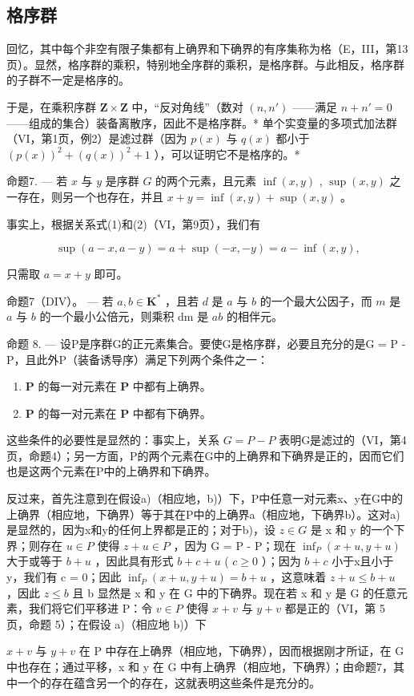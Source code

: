 \subsection{格序群}

回忆，其中每个非空有限子集都有上确界和下确界的有序集称为格（E，III，第13页）。显然，格序群的乘积，特别地全序群的乘积，是格序群。与此相反，格序群的子群不一定是格序的。

于是，在乘积序群 \(\mathbf{Z} \times \mathbf{Z}\) 中，“反对角线”（数对 \((n, n')\) ——满足 \(n + n' = 0\) ——组成的集合）装备离散序，因此不是格序群。* 单个实变量的多项式加法群（VI，第1页，例2）是滤过群（因为 \(p(x)\) 与 \(q(x)\) 都小于 \((p(x))^2 + (q(x))^2 + 1\) ），可以证明它不是格序的。*

命题7. --- 若 \(x\) 与 \(y\) 是序群 \(G\) 的两个元素，且元素 \(\inf(x, y)\) , \(\sup(x, y)\) 之一存在，则另一个也存在，并且 \(x + y = \inf(x, y) + \sup(x, y)\) 。

事实上，根据关系式(1)和(2)（VI，第9页），我们有

\[
\sup (a - x, a - y) = a + \sup (- x, - y) = a - \inf (x, y),
\]

只需取 \(a = x + y\) 即可。

命题7（DIV）。 --- 若 \(a, b \in \mathbf{K}^{*}\) ，且若 \(d\) 是 \(a\) 与 \(b\) 的一个最大公因子，而 \(m\) 是 \(a\) 与 \(b\) 的一个最小公倍元，则乘积 dm 是 \(ab\) 的相伴元。

命题 8. --- 设P是序群G的正元素集合。要使G是格序群，必要且充分的是G = P - P，且此外P（装备诱导序）满足下列两个条件之一：

\begin{enumerate}
\def\labelenumi{\alph{enumi})}
\item
  \(\mathbf{P}\) 的每一对元素在 \(\mathbf{P}\) 中都有上确界。
\item
  \(\mathbf{P}\) 的每一对元素在 \(\mathbf{P}\) 中都有下确界。
\end{enumerate}

这些条件的必要性是显然的：事实上，关系 \(G = P - P\) 表明G是滤过的（VI，第4页，命题4）；另一方面，P的两个元素在G中的上确界和下确界是正的，因而它们也是这两个元素在P中的上确界和下确界。

反过来，首先注意到在假设a)（相应地，b)）下，P中任意一对元素x、y在G中的上确界（相应地，下确界）等于其在P中的上确界a（相应地，下确界b）。这对a)是显然的，因为x和y的任何上界都是正的；对于b)，设 \(z \in G\) 是 x 和 y 的一个下界；则存在 \(u \in P\) 使得 \(z + u \in P\) ，因为 G = P - P；现在 \(\inf_{P}(x + u, y + u)\) 大于或等于 \(b + u\) ，因此具有形式 \(b + c + u\) ( \(c \geqslant 0\) ）；因为 \(b + c\) 小于x且小于y，我们有 c = 0；因此 \(\inf_{P}(x + u, y + u) = b + u\) ，这意味着 \(z + u \leqslant b + u\) ，因此 \(z \leqslant b\) 且 b 显然是 x 和 y 在 G 中的下确界。现在若 x 和 y 是 G 的任意元素，我们将它们平移进 P：令 \(v \in P\) 使得 \(x + v\) 与 \(y + v\) 都是正的（VI，第 5 页，命题 5）；在假设 a)（相应地 b)）下

\(x + v\) 与 \(y + v\) 在 P 中存在上确界（相应地，下确界），因而根据刚才所证，在 G 中也存在；通过平移，x 和 y 在 G 中有上确界（相应地，下确界）；由命题7，其中一个的存在蕴含另一个的存在，这就表明这些条件是充分的。


